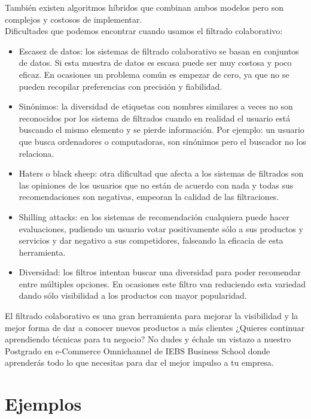 \documentclass[preprint,12pt]{elsarticle}
\begin{document}
\begin{enumerate}[3.1]
También existen algoritmos híbridos que combinan ambos modelos pero son complejos y costosos de implementar.\\
Dificultades que podemos encontrar cuando usamos el filtrado colaborativo:\\
	\begin{itemize}
	\item Escasez de datos: los sistemas de filtrado colaborativo se basan en conjuntos de datos. Si esta muestra de datos es escasa puede ser muy costosa y poco eficaz. En ocasiones un problema común es empezar de cero, ya que no se pueden recopilar preferencias con precisión y fiabilidad.
	\item Sinónimos: la diversidad de etiquetas con nombres similares a veces no son reconocidos por los sistema de filtrados cuando en realidad el usuario está buscando el mismo elemento y se pierde información. Por ejemplo: un usuario que busca ordenadores o computadoras, son sinónimos pero el buscador no los relaciona.
	\item Haters o black sheep: otra dificultad que afecta a los sistemas de filtrados son las opiniones de los usuarios que no están de acuerdo con nada y todas sus recomendaciones son negativas, empeoran la calidad de las filtraciones. 
	\item Shilling attacks: en los sistemas de recomendación cualquiera puede hacer evaluaciones, pudiendo un usuario votar positivamente sólo a sus productos y servicios y dar negativo a sus competidores, falseando la eficacia de esta herramienta. 
	\item Diversidad: los filtros intentan buscar una diversidad para poder recomendar entre múltiples opciones. En ocasiones este filtro van reduciendo esta variedad dando sólo visibilidad a los productos con mayor popularidad.\\
	\end{itemize}

El filtrado colaborativo es una gran herramienta para mejorar la visibilidad y la mejor forma de dar a conocer nuevos productos a más clientes ¿Quieres continuar aprendiendo técnicas para tu negocio? No dudes y échale un vistazo a nuestro Postgrado en e-Commerce Omnichannel de IEBS Business School donde aprenderás todo lo que necesitas para dar el mejor impulso a tu empresa.		

\end{enumerate}



\section{Ejemplos}
\end{document}
